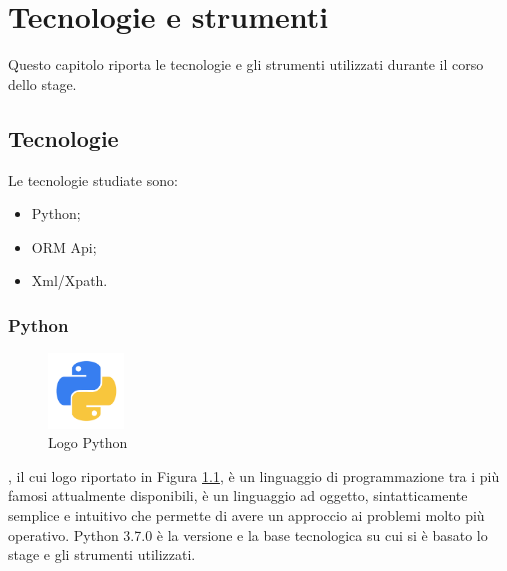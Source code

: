 
\hypertarget{(chap:capitolo6)}{}
\chapter{Tecnologie e strumenti}
Questo capitolo riporta le tecnologie e gli strumenti utilizzati durante il corso dello stage.
\section{Tecnologie}
Le tecnologie studiate sono:
\begin{itemize}
\item Python;
\item ORM Api;
\item Xml/Xpath.
\end{itemize}
\subsection{Python}
\begin{figure}[H]
	\begin{center} \includegraphics[width=2cm]{figures/python}
		\caption[Logo Python]{Logo Python} 
		\label{logo_python} 
	\end{center}
\end{figure}
, il cui logo riportato in Figura \ref{logo_python}, è un linguaggio di programmazione tra i più famosi attualmente disponibili, è un linguaggio ad oggetto, sintatticamente semplice e intuitivo che permette di avere un approccio ai problemi molto più operativo. Python 3.7.0 è la versione e la base tecnologica su cui si è basato lo stage e gli strumenti utilizzati.

